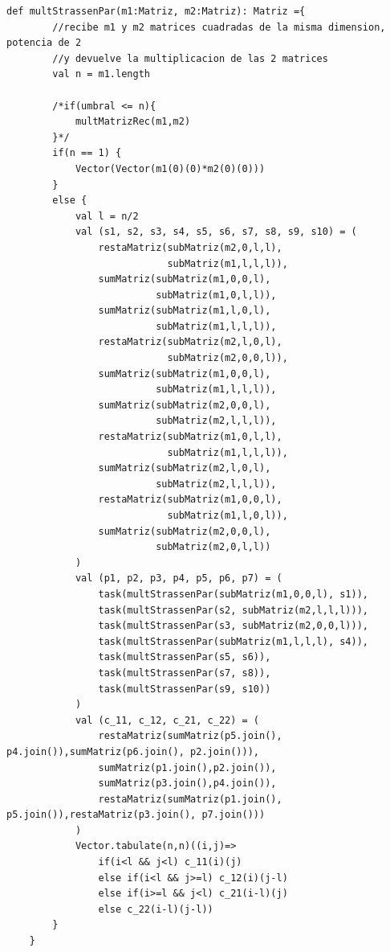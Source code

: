 \documentclass[12pt, a4paper]{article}
\begin{document}
\begin{lstlisting}[caption=mult Strassen paralela, label=lst:scala_code11]
    def multStrassenPar(m1:Matriz, m2:Matriz): Matriz ={
        //recibe m1 y m2 matrices cuadradas de la misma dimension, potencia de 2
        //y devuelve la multiplicacion de las 2 matrices
        val n = m1.length
        
        /*if(umbral <= n){
            multMatrizRec(m1,m2)
        }*/
        if(n == 1) {
            Vector(Vector(m1(0)(0)*m2(0)(0)))
        }
        else {           
            val l = n/2
            val (s1, s2, s3, s4, s5, s6, s7, s8, s9, s10) = (
                restaMatriz(subMatriz(m2,0,l,l), 
                            subMatriz(m1,l,l,l)),
                sumMatriz(subMatriz(m1,0,0,l), 
                          subMatriz(m1,0,l,l)),
                sumMatriz(subMatriz(m1,l,0,l), 
                          subMatriz(m1,l,l,l)),
                restaMatriz(subMatriz(m2,l,0,l), 
                            subMatriz(m2,0,0,l)),
                sumMatriz(subMatriz(m1,0,0,l), 
                          subMatriz(m1,l,l,l)),
                sumMatriz(subMatriz(m2,0,0,l), 
                          subMatriz(m2,l,l,l)),
                restaMatriz(subMatriz(m1,0,l,l),
                            subMatriz(m1,l,l,l)),
                sumMatriz(subMatriz(m2,l,0,l),
                          subMatriz(m2,l,l,l)),
                restaMatriz(subMatriz(m1,0,0,l),
                            subMatriz(m1,l,0,l)),
                sumMatriz(subMatriz(m2,0,0,l),
                          subMatriz(m2,0,l,l))
            )
            val (p1, p2, p3, p4, p5, p6, p7) = (
                task(multStrassenPar(subMatriz(m1,0,0,l), s1)),
                task(multStrassenPar(s2, subMatriz(m2,l,l,l))),
                task(multStrassenPar(s3, subMatriz(m2,0,0,l))),
                task(multStrassenPar(subMatriz(m1,l,l,l), s4)),
                task(multStrassenPar(s5, s6)),
                task(multStrassenPar(s7, s8)),
                task(multStrassenPar(s9, s10))
            )
            val (c_11, c_12, c_21, c_22) = (
                restaMatriz(sumMatriz(p5.join(), p4.join()),sumMatriz(p6.join(), p2.join())),
                sumMatriz(p1.join(),p2.join()),
                sumMatriz(p3.join(),p4.join()),
                restaMatriz(sumMatriz(p1.join(), p5.join()),restaMatriz(p3.join(), p7.join()))
            )            
            Vector.tabulate(n,n)((i,j)=>
                if(i<l && j<l) c_11(i)(j)
                else if(i<l && j>=l) c_12(i)(j-l)
                else if(i>=l && j<l) c_21(i-l)(j)
                else c_22(i-l)(j-l))
        }
    }
\end{lstlisting}
\end{document}
